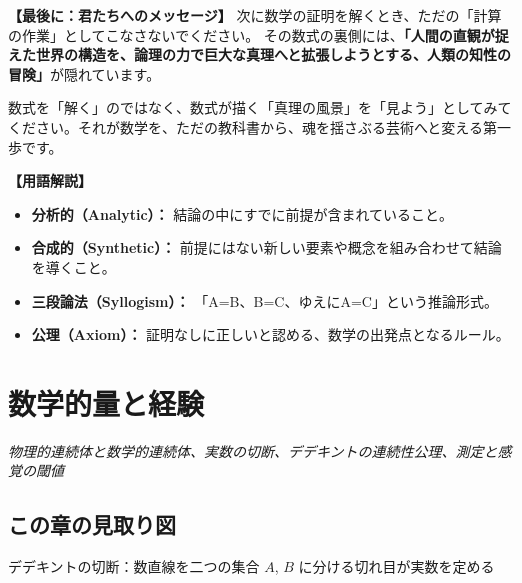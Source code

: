 \documentclass[a4paper,11pt,openany]{ltjsbook}
\begin{document}
\begin{lecturebox}
\textbf{【最後に：君たちへのメッセージ】}
次に数学の証明を解くとき、ただの「計算の作業」としてこなさないでください。
その数式の裏側には、\textbf{「人間の直観が捉えた世界の構造を、論理の力で巨大な真理へと拡張しようとする、人類の知性の冒険」}が隠れています。

数式を「解く」のではなく、数式が描く「真理の風景」を「見よう」としてみてください。それが数学を、ただの教科書から、魂を揺さぶる芸術へと変える第一歩です。

\textbf{【用語解説】}
\begin{itemize}[leftmargin=2em]
\item \textbf{分析的（Analytic）：} 結論の中にすでに前提が含まれていること。
\item \textbf{合成的（Synthetic）：} 前提にはない新しい要素や概念を組み合わせて結論を導くこと。
\item \textbf{三段論法（Syllogism）：} 「A=B、B=C、ゆえにA=C」という推論形式。
\item \textbf{公理（Axiom）：} 証明なしに正しいと認める、数学の出発点となるルール。
\end{itemize}
\end{lecturebox}


\clearpage
\chapter{数学的量と経験}
\begin{center}\large\textit{物理的連続体と数学的連続体、実数の切断、デデキントの連続性公理、測定と感覚の閾値}\end{center}

\section*{この章の見取り図}
\begin{center}


\small デデキントの切断：数直線を二つの集合 $A$, $B$ に分ける切れ目が実数を定める
\end{center}
\end{document}
